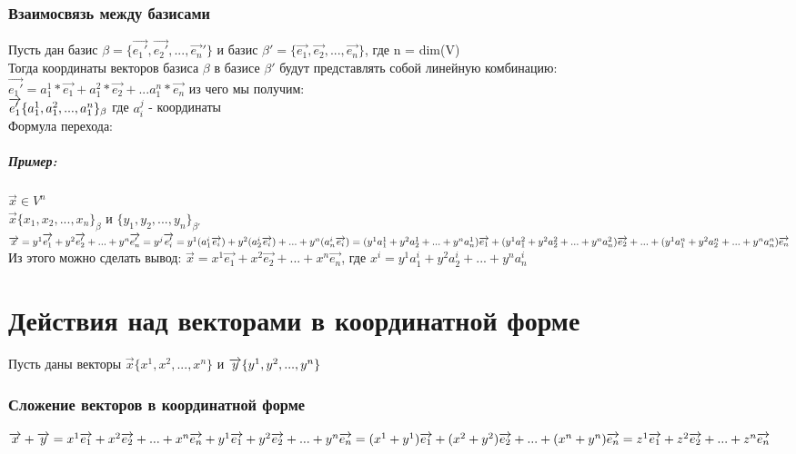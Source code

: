 \documentclass{book}
\begin{document}
\subsection{Взаимосвязь между базисами}
Пусть дан базис $\beta=\{\overrightarrow{e_1'},\overrightarrow{e_2'},...,\overrightarrow{e_n}'\}$ и базис $\beta'=\{\overrightarrow{e_1},\overrightarrow{e_2},...,\overrightarrow{e_n}\}$, где n = dim(V)\\
Тогда координаты векторов базиса $\beta$ в базисе $\beta'$ будут представлять собой линейную комбинацию: \\
$\overrightarrow{e_1'}=a_1^1*\overrightarrow{e_1}+a_1^2*\overrightarrow{e_2}+...a_1^n*\overrightarrow{e_n}$ из чего мы получим:\\
$\overrightarrow{e_1'}\{a_1^1,a_1^2,...,a_1^n\}_\beta\\$
где $a^j_i$ - координаты\\
Формула перехода:
\paragraph*{Пример:}
$\overrightarrow{x} \in V^n$\\
$\overrightarrow{x}\{x_1,x_2,...,x_n\}_\beta$ и $\{y_1,y_2,...,y_n\}_{\beta'}$\\
$\overrightarrow{x}=y^1\overrightarrow{e_1'}+y^2\overrightarrow{e_2'}+...+y^n\overrightarrow{e_n'}=y^j\overrightarrow{e_i'}=y^1(a^i_1\overrightarrow{e_i})+y^2(a^i_2\overrightarrow{e_i})+...+y^n(a^i_n\overrightarrow{e_i})=(y^1a_1^1+y^2a_2^1+...+y^{n}a^1_n)\overrightarrow{e_1}+(y^1a_1^2+y^2a_2^2+...+y^{n}a^2_n)\overrightarrow{e_2}+...+(y^1a_1^n+y^2a_2^n+...+y^{n}a^n_n)\overrightarrow{e_n}\\$
Из этого можно сделать вывод:
$\overrightarrow{x}=x^1\overrightarrow{e_1}+x^2\overrightarrow{e_2}+...+x^n\overrightarrow{e_n}$, где $x^i=y^1a_1^i+y^2a_2^i+...+y^{n}a^i_n$

\newpage
\chapter{Действия над векторами в координатной форме}
Пусть даны векторы $\overrightarrow{x}\{x^1,x^2,...,x^n\}$ и $\overrightarrow{y}\{y^1,y^2,...,y^n\}\\$
\subsection{Сложение векторов в координатной форме}
$\overrightarrow{x}+\overrightarrow{y}=x^1\overrightarrow{e_1}+x^2\overrightarrow{e_2}+...+x^n\overrightarrow{e_n}+y^1\overrightarrow{e_1}+y^2\overrightarrow{e_2}+...+y^n\overrightarrow{e_n}=(x^1+y^1)\overrightarrow{e_1}+(x^2+y^2)\overrightarrow{e_2}+...+(x^n+y^n)\overrightarrow{e_n}=z^1\overrightarrow{e_1}+z^2\overrightarrow{e_2}+...+z^n\overrightarrow{e_n}\\$
\end{document}
